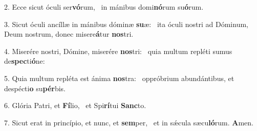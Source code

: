 2. Ecce sicut óculi ser\textbf{vó}rum, \ast\  in mánibus domi\textbf{nó}rum su\textbf{ó}rum.\

3. Sicut óculi ancíllæ in mánibus dóminæ \textbf{su}æ: \ast\  ita óculi nostri ad Dóminum, Deum nostrum, donec misere\textbf{á}tur \textbf{nos}tri.\

4. Miserére nostri, Dómine, miserére \textbf{nos}tri: \ast\  quia multum repléti sumus de\textbf{spec}ti\textbf{ó}ne:\

5. Quia multum repléta est ánima \textbf{nos}tra: \ast\  oppróbrium abundántibus, et despécti\textbf{o} su\textbf{pér}bis.\

6. Glória Patri, et \textbf{Fí}lio, \ast\  et Spi\textbf{rí}tui \textbf{Sanc}to.\

7. Sicut erat in princípio, et nunc, et \textbf{sem}per, \ast\  et in sǽcula sæcu\textbf{ló}rum. \textbf{A}men.\

